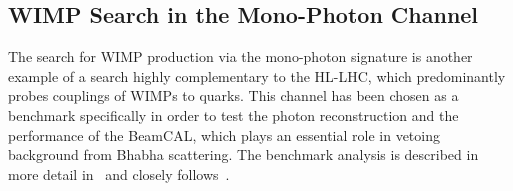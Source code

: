 \subsection{WIMP Search in the Mono-Photon Channel}

The search for WIMP production via the mono-photon signature is another example of a search highly complementary to the HL-LHC, which predominantly probes couplings of WIMPs to quarks. This channel has been chosen as a  benchmark specifically in order to test the photon reconstruction and the performance of the BeamCAL, which plays an essential role in vetoing background from Bhabha scattering. The benchmark analysis is described in more detail in~\cite{ILDNote:WIMPs} and closely follows~\cite{Habermehl:2018yul}.
